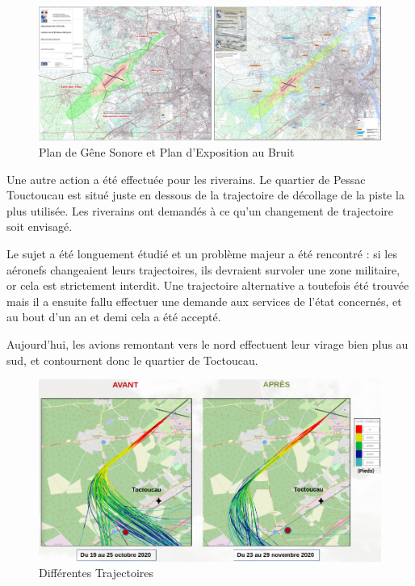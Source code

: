 \begin{figure}[hbt!]
  \centering
  \includegraphics[width=16cm]{Images/pgs_peb.png}\newline
  \caption{Plan de Gêne Sonore et Plan d'Exposition au Bruit}
  \label{fig:pgs_peb}
\end{figure}


Une autre action a été effectuée pour les riverains. Le quartier de Pessac Touctoucau est situé juste en dessous de la trajectoire de décollage de la piste la plus utilisée. Les riverains ont demandés à ce qu'un changement de trajectoire soit envisagé.

Le sujet a été longuement étudié et un problème majeur a été rencontré : si les aéronefs changeaient leurs trajectoires, ils devraient survoler une zone militaire, or cela est strictement interdit.
Une trajectoire alternative a toutefois été trouvée mais il a ensuite fallu effectuer une demande aux services de l'état concernés, et au bout d'un an et demi cela a été accepté.\newline

Aujourd'hui, les avions remontant vers le nord effectuent leur virage bien plus au sud, et contournent donc le quartier de Toctoucau.\newline

\begin{figure}[hbt!]
  \centering
  \includegraphics[width=13.5cm]{Images/trajectoires_avant_apres.png}\newline
  \caption{Différentes Trajectoires}
  \label{fig:trajectoires}
\end{figure}

